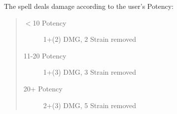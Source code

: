 \documentclass[11pt,a4paper,twocolumn]{book}
\begin{document}
The spell deals damage according to the user's Potency:
\begin{quote}
	\begin{description}
		\item[$<$10 Potency] 	1+(2) DMG, 2 Strain removed
		\item[11-20 Potency] 1+(3) DMG, 3 Strain removed
		\item[20+ Potency] 	    2+(3) DMG, 5 Strain removed
	\end{description}	
\end{quote}

\vfill

%	
%
%
%

\end{document}
